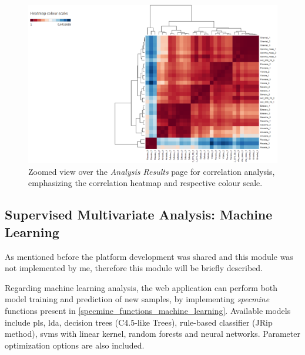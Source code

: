 \begin{figure}[h]
	\centering
	\includegraphics[width=1\linewidth]{Imagens/webspecmine_correlation}
	\caption{Zoomed view over the \textit{Analysis Results} page for correlation analysis, emphasizing the correlation heatmap and respective colour scale.}
	\label{webspecmine_correlation}
\end{figure}



\subsection{Supervised Multivariate Analysis: Machine Learning}

As mentioned before the platform development was shared and this module was not implemented by me, therefore this module will be briefly described.

Regarding machine learning analysis, the web application can perform both model training and prediction of new samples, by implementing \textit{specmine} functions present in \autoref{specmine_functions_machine_learning}. Available models include \gls{pls}, \gls{lda}, decision trees (C4.5-like Trees), rule-based classifier (JRip method), \gls{svm}s with linear kernel, random forests and neural networks. Parameter optimization options are also included. 


